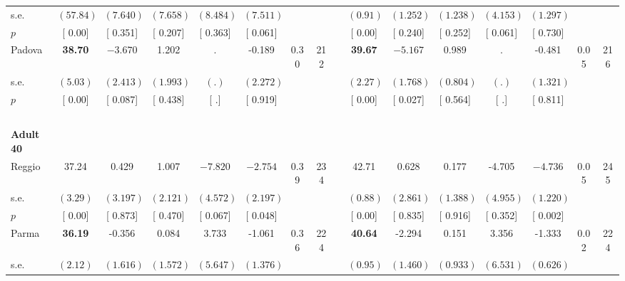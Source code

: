 \begin{longtable}{L{8em} c c c c c c c p{1em} c c c c c c c}
\quad \quad \quad \quad s.e.& $ (    57.84)$ & $ (    7.640)$ & $ (    7.658)$ & $ (    8.484)$ & $ (    7.511)$ & & & & $ (     0.91)$ & $ (    1.252)$ & $ (    1.238)$ & $ (    4.153)$ & $ (    1.297)$ & &  \\*
\quad \quad \quad \quad $ p$ & [     0.00] & [    0.351] & [    0.207] & [    0.363] & [    0.061] & & & & [     0.00] & [    0.240] & [    0.252] & [    0.061] & [    0.730] & &  \\[1em]
\quad \quad \quad Padova& \textbf{    38.70} & $ \mathbf{   -3.670}$ &     1.202 &         . &    -0.189 &      0.30 &       212 & & \textbf{    39.67} & $ \mathbf{   -5.167}$ &     0.989 &         . &    -0.481 &      0.05 &       216  \\*
\quad \quad \quad \quad s.e.& $ (     5.03)$ & $ (    2.413)$ & $ (    1.993)$ & $ (        .)$ & $ (    2.272)$ & & & & $ (     2.27)$ & $ (    1.768)$ & $ (    0.804)$ & $ (        .)$ & $ (    1.321)$ & &  \\*
\quad \quad \quad \quad $ p$ & [     0.00] & [    0.087] & [    0.438] & [        .] & [    0.919] & & & & [     0.00] & [    0.027] & [    0.564] & [        .] & [    0.811] & &  \\[1em]
~\\[1em]
\quad \quad \textbf{Adult 40} & & & & & & & & & & & & & & & \\* 
\quad \quad \quad Reggio& 37.24 &     0.429 &     1.007 & $ \mathbf{   -7.820}$ & $ \mathbf{   -2.754}$ &      0.39 &       234 & & 42.71 &     0.628 &     0.177 &    -4.705 & $ \mathbf{   -4.736}$ &      0.05 &       245  \\*
\quad \quad \quad \quad s.e.& $ (     3.29)$ & $ (    3.197)$ & $ (    2.121)$ & $ (    4.572)$ & $ (    2.197)$ & & & & $ (     0.88)$ & $ (    2.861)$ & $ (    1.388)$ & $ (    4.955)$ & $ (    1.220)$ & &  \\*
\quad \quad \quad \quad $ p$ & [     0.00] & [    0.873] & [    0.470] & [    0.067] & [    0.048] & & & & [     0.00] & [    0.835] & [    0.916] & [    0.352] & [    0.002] & &  \\[1em]
\quad \quad \quad Parma& \textbf{    36.19} &    -0.356 &     0.084 &     3.733 &    -1.061 &      0.36 &       224 & & \textbf{    40.64} &    -2.294 &     0.151 &     3.356 &    -1.333 &      0.02 &       224  \\*
\quad \quad \quad \quad s.e.& $ (     2.12)$ & $ (    1.616)$ & $ (    1.572)$ & $ (    5.647)$ & $ (    1.376)$ & & & & $ (     0.95)$ & $ (    1.460)$ & $ (    0.933)$ & $ (    6.531)$ & $ (    0.626)$ & &  \\*

\end{longtable}
